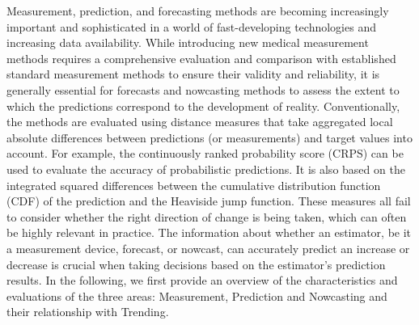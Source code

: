 
Measurement, prediction, and forecasting methods are becoming increasingly important and sophisticated in a world of fast-developing technologies and increasing data availability. While introducing new medical measurement methods requires a comprehensive evaluation and comparison with established standard measurement methods to ensure their validity and reliability, it is generally essential for forecasts and nowcasting methods to assess the extent to which the predictions correspond to the development of reality. Conventionally, the methods are evaluated using distance measures that take aggregated local absolute differences between predictions (or measurements) and target values into account. For example, the continuously ranked probability score (CRPS) can be used to evaluate the accuracy of probabilistic predictions. It is also based on the integrated squared differences between the cumulative distribution function (CDF) of the prediction and the Heaviside jump function. These measures all fail to consider whether the right direction of change is being taken, which can often be highly relevant in practice. The information about whether an estimator, be it a measurement device, forecast, or nowcast, can accurately predict an increase or decrease is crucial when taking decisions based  on  the estimator's prediction results. In the following, we first provide an overview of the characteristics and evaluations of the three areas: Measurement, Prediction and Nowcasting and their relationship with Trending.
 
